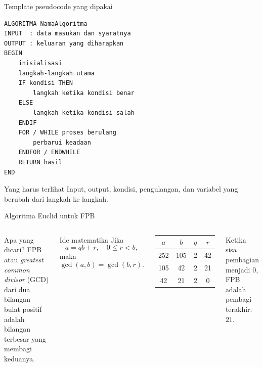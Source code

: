 \documentclass[aspectratio=169,11pt]{beamer}
\begin{document}
\begin{frame}[fragile]{Template pseudocode yang dipakai}
\begin{lstlisting}[language={}]
ALGORITMA NamaAlgoritma
INPUT  : data masukan dan syaratnya
OUTPUT : keluaran yang diharapkan
BEGIN
    inisialisasi
    langkah-langkah utama
    IF kondisi THEN
        langkah ketika kondisi benar
    ELSE
        langkah ketika kondisi salah
    ENDIF
    FOR / WHILE proses berulang
        perbarui keadaan
    ENDFOR / ENDWHILE
    RETURN hasil
END
\end{lstlisting}
\vspace{-1mm}
\begin{block}{Yang harus terlihat}
Input, output, kondisi, pengulangan, dan variabel yang berubah dari langkah ke langkah.
\end{block}
\end{frame}

\begin{frame}{Algoritma Euclid untuk FPB}
\begin{columns}[T]
\begin{block}{Apa yang dicari?}
FPB atau \textit{greatest common divisor} (GCD) dari dua bilangan bulat positif adalah bilangan terbesar yang membagi keduanya.
\end{block}
\begin{block}{Ide matematika}
Jika
\[
 a = qb + r, \quad 0 \le r < b,
\]
maka
\[
 \gcd(a,b)=\gcd(b,r).
\]
\end{block}
\begin{center}
\begin{tabular}{c c c c}
\toprule
$a$ & $b$ & $q$ & $r$ \\
\midrule
252 & 105 & 2 & 42 \\
105 & 42 & 2 & 21 \\
42 & 21 & 2 & 0 \\
\bottomrule
\end{tabular}
\end{center}
\vspace{1mm}
Ketika sisa pembagian menjadi 0, FPB adalah pembagi terakhir: $21$.
\end{columns}
\end{frame}
\end{document}
